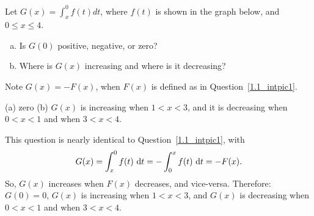 \begin{question}
Let $G(x) = \displaystyle\int_x^0 f(t)dt$, where $f(t)$ is shown in the graph below, and $0 \leq x \leq 4$.
\begin{enumerate}[(a)]
\item Is $G(0)$ positive, negative, or zero?
\item Where is $G(x)$ increasing and where is it decreasing?
\end{enumerate}
\begin{center}
\end{center}
\end{question}
\begin{hint}
Note $G(x)=-F(x)$, when $F(x)$ is defined as in Question~\ref{1.1_intpic1}.
\end{hint}
\begin{answer}
(a) zero \qquad (b) $G(x)$ is increasing when $1<x<3$, and it is decreasing when $0<x<1$ and when $3<x<4$.
\end{answer}
\begin{solution}
This question is nearly identical to Question~\ref{1.1_intpic1}, with
\[G(x) = \displaystyle\int_x^0 f(t)\ \mathrm{d}t = -\displaystyle\int_0^x f(t)\ \mathrm{d}t=-F(x).\]
So, $G(x)$ increases when $F(x)$ decreases, and vice-versa. Therefore: $G(0)=0$, $G(x)$ is increasing when $1<x<3$, and $G(x)$ is decreasing when $0<x<1$ and when $3<x<4$.
\end{solution}

